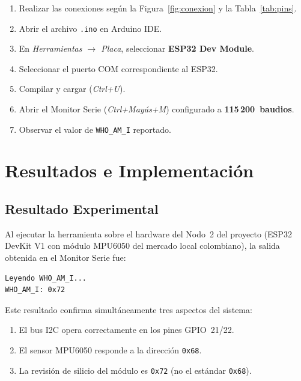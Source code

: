 \documentclass[10pt,twocolumn,a4paper]{article}
\begin{document}
\begin{enumerate}
  \item Realizar las conexiones según la Figura~\ref{fig:conexion} y
        la Tabla~\ref{tab:pins}.
  \item Abrir el archivo \texttt{.ino} en Arduino IDE.
  \item En \textit{Herramientas $\rightarrow$ Placa}, seleccionar
        \textbf{ESP32 Dev Module}.
  \item Seleccionar el puerto COM correspondiente al ESP32.
  \item Compilar y cargar (\textit{Ctrl+U}).
  \item Abrir el Monitor Serie (\textit{Ctrl+Mayús+M}) configurado a
        \textbf{115\,200~baudios}.
  \item Observar el valor de \texttt{WHO\_AM\_I} reportado.
\end{enumerate}

\section{Resultados e Implementación}
\label{sec:resultados}

\subsection{Resultado Experimental}

Al ejecutar la herramienta sobre el hardware del Nodo~2 del proyecto
(ESP32 DevKit V1 con módulo MPU6050 del mercado local colombiano), la
salida obtenida en el Monitor Serie fue:

\begin{lstlisting}[style=output,
  caption={Salida del Monitor Serie (115\,200 baudios)},
  label=lst:out]
Leyendo WHO_AM_I...
WHO_AM_I: 0x72
\end{lstlisting}

Este resultado confirma simultáneamente tres aspectos del sistema:
\begin{enumerate}
  \item El bus I2C opera correctamente en los pines GPIO~21/22.
  \item El sensor MPU6050 responde a la dirección \texttt{0x68}.
  \item La revisión de silicio del módulo es \texttt{0x72} (no el
        estándar \texttt{0x68}).
\end{enumerate}
\end{document}
